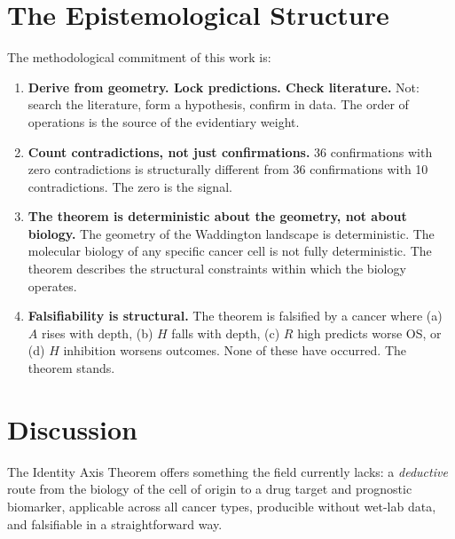 \documentclass[11pt, a4paper]{article}
\begin{document}
\section{The Epistemological Structure}
\label{sec:epistemology}

The methodological commitment of this work is:

\begin{enumerate}
    \item \textbf{Derive from geometry. Lock predictions.
    Check literature.}
    Not: search the literature, form a hypothesis,
    confirm in data.
    The order of operations is the source of
    the evidentiary weight.

    \item \textbf{Count contradictions, not just
    confirmations.}
    36 confirmations with zero contradictions is
    structurally different from 36 confirmations
    with 10 contradictions. The zero is the signal.

    \item \textbf{The theorem is deterministic about
    the geometry, not about biology.}
    The geometry of the Waddington landscape is
    deterministic. The molecular biology of any
    specific cancer cell is not fully deterministic.
    The theorem describes the structural constraints
    within which the biology operates.

    \item \textbf{Falsifiability is structural.}
    The theorem is falsified by a cancer where
    (a) $A$ rises with depth, (b) $H$ falls with
    depth, (c) $R$ high predicts worse OS, or
    (d) $H$ inhibition worsens outcomes.
    None of these have occurred. The theorem stands.
\end{enumerate}

\section{Discussion}
\label{sec:discussion}

The Identity Axis Theorem offers something the field
currently lacks: a \emph{deductive} route from the
biology of the cell of origin to a drug target and
prognostic biomarker, applicable across all cancer
types, producible without wet-lab data, and
falsifiable in a straightforward way.
\end{document}
